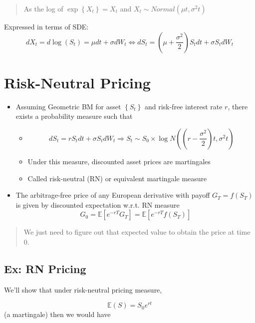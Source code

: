 \documentclass[
  oneside]{book}
\providecommand{\tightlist}{%
  \setlength{\itemsep}{0pt}\setlength{\parskip}{0pt}}
\begin{document}
\begin{quote}
As the log of \(\exp \left\{ X_{t} \right\} = X_{t}\) and \(X_{t} \sim Normal(\mu t, \sigma^{2}t)\)
\end{quote}

Expressed in terms of SDE:
\[
d X_t=d \log \left(S_t\right)=\mu d t+\sigma d W_t \Leftrightarrow d S_t=\left(\mu+\frac{\sigma^2}{2}\right) S_t d t+\sigma S_t d W_t
\]

\hypertarget{risk-neutral-pricing}{%
\section{Risk-Neutral Pricing}\label{risk-neutral-pricing}}

\begin{itemize}
\tightlist
\item
  Assuming Geometric BM for asset \(\left\{S_t\right\}\) and risk-free interest rate \(r\), there exists a probability measure such that

  \begin{itemize}
  \tightlist
  \item
    \[
    d S_t=r S_t d t+\sigma S_t d W_t \Rightarrow S_t \sim S_0 \times \log N\left(\left(r-\frac{\sigma^2}{2}\right) t, \sigma^2 t\right)\]
  \item
    Under this measure, discounted asset prices are martingales
  \item
    Called risk-neutral (RN) or equivalent martingale measure
  \end{itemize}
\item
  The arbitrage-free price of any European derivative with payoff \(G_T=f\left(S_T\right)\) is given by discounted expectation w.r.t. RN measure
  \[
  G_0=\mathbb{E}\left[e^{-r T} G_T\right]=\mathbb{E}\left[e^{-r T} f\left(S_T\right)\right]
  \]
\end{itemize}

\begin{quote}
We just need to figure out that expected value to obtain the price at time \(0\).
\end{quote}

\hypertarget{ex-rn-pricing}{%
\subsection{Ex: RN Pricing}\label{ex-rn-pricing}}

We'll show that under risk-neutral pricing measure,

\[
\mathbb{E}(S) = S_{0}e^{rt}
\] (a martingale)
then we would have
\end{document}
